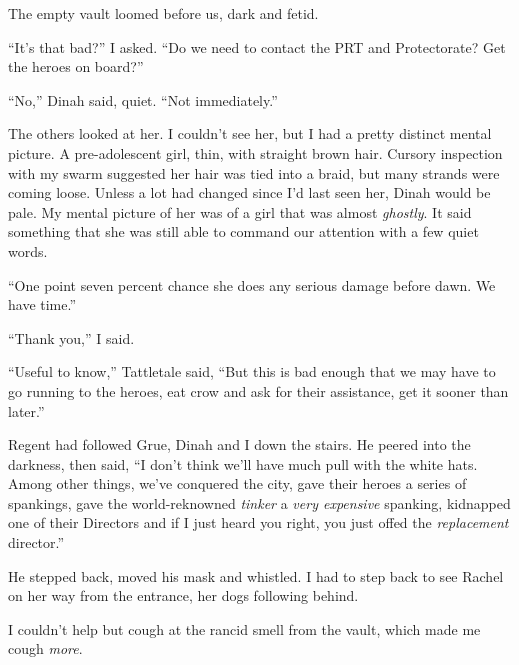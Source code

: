 





The empty vault loomed before us, dark and fetid.



``It's that bad?'' I asked.  ``Do we need to contact the PRT and Protectorate?  Get the heroes on board?''



``No,'' Dinah said, quiet.  ``Not immediately.''



The others looked at her.  I couldn't see her, but I had a pretty distinct mental picture.  A pre-adolescent girl, thin, with straight brown hair.  Cursory inspection with my swarm suggested her hair was tied into a braid, but many strands were coming loose.  Unless a lot had changed since I'd last seen her, Dinah would be pale.  My mental picture of her was of a girl that was almost \emph{ghostly}.  It said something that she was still able to command our attention with a few quiet words.



``One point seven percent chance she does any serious damage before dawn.  We have time.''



``Thank you,'' I said.



``Useful to know,'' Tattletale said, ``But this is bad enough that we may have to go running to the heroes, eat crow and ask for their assistance, get it sooner than later.''



Regent had followed Grue, Dinah and I down the stairs.  He peered into the darkness, then said, ``I don't think we'll have much pull with the white hats.  Among other things, we've conquered the city, gave their heroes a series of spankings, gave the world-reknowned \emph{tinker} a \emph{very expensive} spanking, kidnapped one of their Directors and if I just heard you right, you just offed the \emph{replacement} director.''



He stepped back, moved his mask and whistled.  I had to step back to see Rachel on her way from the entrance, her dogs following behind.



I couldn't help but cough at the rancid smell from the vault, which made me cough \emph{more}.



